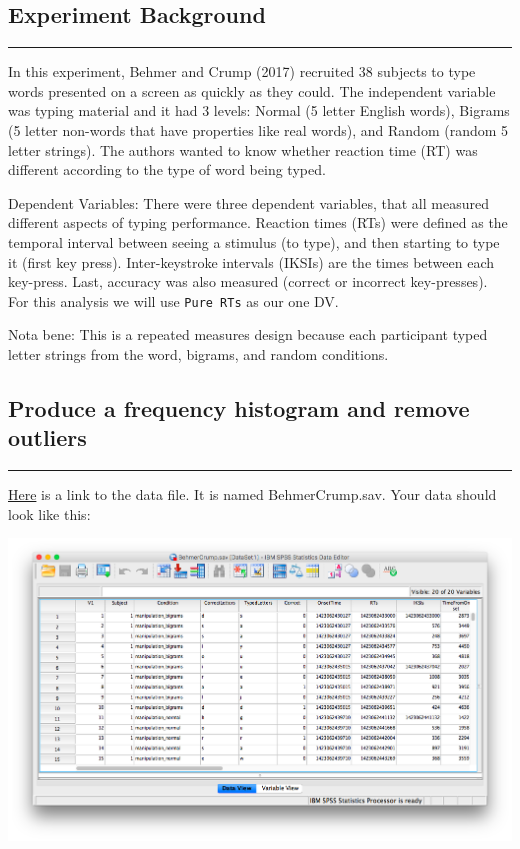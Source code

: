 \documentclass[
]{book}
\begin{document}
\hypertarget{experiment-background-6}{%
\subsection{Experiment Background}\label{experiment-background-6}}

\begin{center}\rule{0.5\linewidth}{0.5pt}\end{center}

In this experiment, Behmer and Crump (2017) recruited 38 subjects to type words presented on a screen as quickly as they could. The independent variable was typing material and it had 3 levels: Normal (5 letter English words), Bigrams (5 letter non-words that have properties like real words), and Random (random 5 letter strings). The authors wanted to know whether reaction time (RT) was different according to the type of word being typed.

Dependent Variables: There were three dependent variables, that all measured different aspects of typing performance. Reaction times (RTs) were defined as the temporal interval between seeing a stimulus (to type), and then starting to type it (first key press). Inter-keystroke intervals (IKSIs) are the times between each key-press. Last, accuracy was also measured (correct or incorrect key-presses). For this analysis we will use \texttt{Pure\ RTs} as our one DV.

Nota bene: This is a repeated measures design because each participant typed letter strings from the word, bigrams, and random conditions.

\hypertarget{produce-a-frequency-histogram-and-remove-outliers}{%
\subsection{Produce a frequency histogram and remove outliers}\label{produce-a-frequency-histogram-and-remove-outliers}}

\begin{center}\rule{0.5\linewidth}{0.5pt}\end{center}

\href{https://github.com/CrumpLab/statisticsLab/blob/master/data/spssdata/BehmerCrump.sav}{Here} is a link to the data file. It is named BehmerCrump.sav. Your data should look like this:

\includegraphics{img/9.4.11.png}
\end{document}
